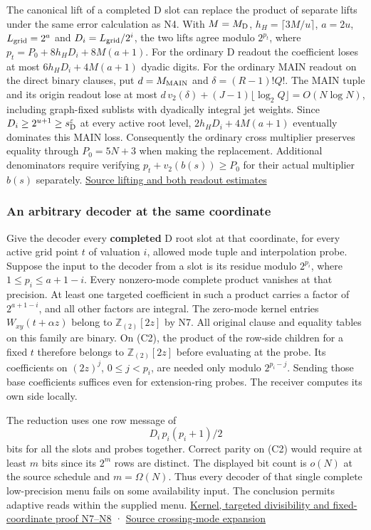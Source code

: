 \documentclass[11pt,a4paper]{article}
\begin{document}
The canonical lift of a completed D slot can replace the product of
separate lifts under the same error calculation as N4. With
\(M=M_{\rm D}\), \(h_H=\lceil3M/u\rceil\), \(a=2u\),
\(L_{\rm grid}=2^a\) and \(D_i=L_{\rm grid}/2^i\), the two lifts agree
modulo \(2^{p_t}\), where \(p_t=P_0+8h_HD_i+8M(a+1)\). For the ordinary
D readout the coefficient loses at most \(6h_HD_i+4M(a+1)\) dyadic
digits. For the ordinary MAIN readout on the direct binary clauses, put
\(d=M_{\rm MAIN}\) and \(\delta=(R-1)!Q!\). The MAIN tuple and its
origin readout lose at most
\(d\,v_2(\delta)+(J-1)\lfloor\log_2 Q\rfloor=O(N\log N)\), including
graph-fixed sublists with dyadically integral jet weights. Since
\(D_i\ge 2^{u+1}\ge s_{\rm D}^{\varepsilon}\) at every active root
level, \(2h_HD_i+4M(a+1)\) eventually dominates this MAIN loss.
Consequently the ordinary cross multiplier preserves equality through
\(P_0=5N+3\) when making the replacement. Additional denominators
require verifying \(p_t+v_2(b(s))\ge P_0\) for their actual multiplier
\(b(s)\) separately. \hyperref[v8-section-native-escape]{Source lifting and
both readout estimates}

\subsubsection{An arbitrary decoder at the same
coordinate}\label{v8-an-arbitrary-decoder-at-the-same-coordinate}

Give the decoder every \textbf{completed} D root slot at that
coordinate, for every active grid point \(t\) of valuation \(i\),
allowed mode tuple and interpolation probe. Suppose the input to the
decoder from a slot is its residue modulo \(2^{p_i}\), where
\(1\le p_i\le a+1-i\). Every nonzero-mode complete product vanishes at
that precision. At least one targeted coefficient in such a product
carries a factor of \(2^{a+1-i}\), and all other factors are integral.
The zero-mode kernel entries \(W_{xy}(t+\alpha z)\) belong to
\(\mathbb Z_{(2)}[2z]\) by N7. All original clause and equality tables
on this family are binary. On (C2), the product of the row-side children
for a fixed \(t\) therefore belongs to \(\mathbb Z_{(2)}[2z]\) before
evaluating at the probe. Its coefficients on \((2z)^j\), \(0\le j<p_i\),
are needed only modulo \(2^{p_i-j}\). Sending those base coefficients
suffices even for extension-ring probes. The receiver computes its own
side locally.

The reduction uses one row message of \[
                       D_i\,p_i(p_i+1)/2
\] bits for all the slots and probes together. Correct parity on (C2)
would require at least \(m\) bits since its \(2^m\) rows are distinct.
The displayed bit count is \(o(N)\) at the source schedule and
\(m=\Omega(N)\). Thus every decoder of that single complete
low-precision menu fails on some availability input. The conclusion
permits adaptive reads within the supplied menu.
\hyperref[v8-section-native-escape]{Kernel, targeted divisibility and
fixed-coordinate proof N7--N8} ·
\href{https://github.com/openai/math/blob/main/preprints/The-Exponential-Time-Hypothesis-is-False-October-25-2026/build/quantitative-contraction.tex\#L402}{Source
crossing-mode expansion}
\end{document}
